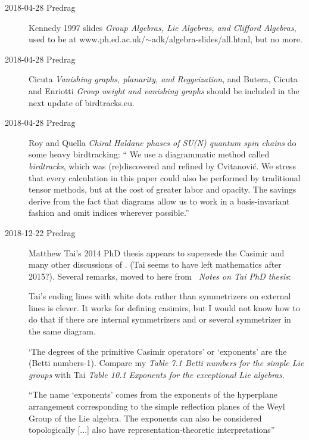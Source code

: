 \begin{description}
\item[2018-04-28 Predrag]
Kennedy 1997 slides
{\em Group Algebras, {Lie} Algebras, and {Clifford} Algebras},
used to be at www.ph.ed.ac.uk/$\sim$adk/algebra-slides/all.html, but no more.

\item[2018-04-28 Predrag]
Cicuta {\em Vanishing graphs, planarity, and {Reggeization}},
and
Butera, Cicuta and Enriotti {\em Group weight and vanishing graphs}
should be included in the next update of birdtracks.eu.

\item[2018-04-28 Predrag]
Roy and Quella
{\em Chiral Haldane phases of {SU}(N) quantum spin chains}
do some heavy birdtracking: ``
We  use  a  diagrammatic  method  called \emph{birdtracks},  which
was (re)discovered and refined by Cvitanovi{\'c}. We stress
that every calculation in this paper could also be performed
by traditional tensor methods, but at the cost of greater labor
and opacity. The savings derive from the fact that diagrams
allow us to work in a basis-invariant fashion and omit indices
wherever possible.''

\item[2018-12-22 Predrag]
{Matthew Tai}'s 2014 PhD thesis
appears to supersede the Casimir and many other discussions of {\wwwgt}.
(Tai seems to have left mathematics after 2015?).
Several remarks,  moved to here from
~{\em Notes on Tai PhD thesis}:

Tai's ending lines with white dots rather than symmetrizers on external
lines is clever. It works for defining casimirs, but I would not know how
to do that if there are internal symmetrizers and or several symmetrizer
in the same diagram.

`The degrees of the primitive Casimir operators' or `exponents' are the
(Betti numbers-1). Compare my  {\em Table 7.1 Betti numbers for
the simple Lie groups} with  Tai {\em Table 10.1 Exponents for the
exceptional Lie algebras}.

``The name `exponents' comes from the exponents of the hyperplane
arrangement corresponding to the simple reflection planes of the Weyl
Group of the Lie algebra. The exponents can also be considered
topologically [...] also have representation-theoretic interpretations''


\end{description}
